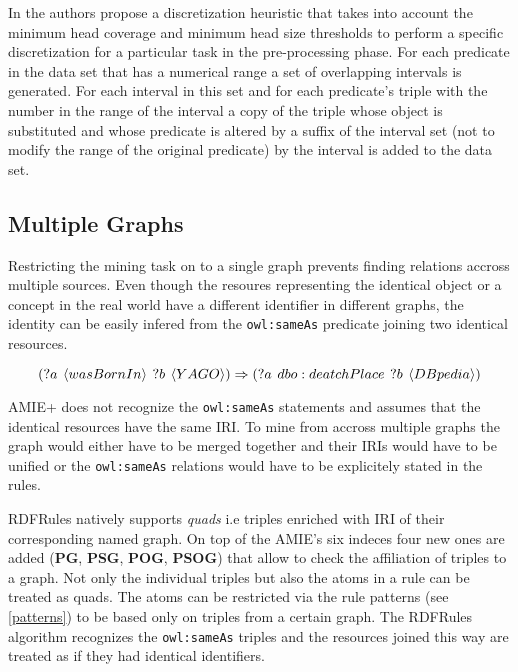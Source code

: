 In \cite{Zeman2020} the authors propose a discretization heuristic that takes into account the minimum head coverage and minimum head size thresholds to perform a specific discretization for a particular task in the pre-processing phase. For each predicate in the data set that has a numerical range a set of overlapping intervals is generated. For each interval in this set and for each predicate's triple with the number in the range of the interval a copy of the triple whose object is substituted and whose predicate is altered by a suffix of the interval set (not to modify the range of the original predicate) by the interval is added to the data set.   

\subsection{Multiple Graphs}

Restricting the mining task on to a single graph prevents finding relations accross multiple sources. Even though the resoures representing the identical object or a concept in the real world have a different identifier in different graphs, the identity can be easily infered from the \verb|owl:sameAs| predicate joining two identical resources.

$$(?a \hspace{0.4em} \langle wasBornIn \rangle \hspace{0.4em} ?b \hspace{0.4em} \langle YAGO \rangle) \Rightarrow (?a \hspace{0.4em} dbo:deatchPlace \hspace{0.4em} ?b \hspace{0.4em} \langle DBpedia \rangle)$$

AMIE+ does not recognize the \verb|owl:sameAs| statements and assumes that the identical resources have the same IRI. To mine from accross multiple graphs the graph would either have to be merged together and their IRIs would have to be unified or the \verb|owl:sameAs| relations would have to be explicitely stated in the rules.

RDFRules natively supports \textit{quads} i.e triples enriched with IRI of their corresponding named graph. On top of the AMIE's six indeces four new ones are added (\textbf{PG}, \textbf{PSG}, \textbf{POG}, \textbf{PSOG}) that allow to check the affiliation of triples to a graph. Not only the individual triples but also the atoms in a rule can be treated as quads. The atoms can be restricted via the rule patterns (see \ref{patterns}) to be based only on triples from a certain graph. The RDFRules algorithm recognizes the \verb|owl:sameAs| triples and the resources joined this way are treated as if they had identical identifiers.

